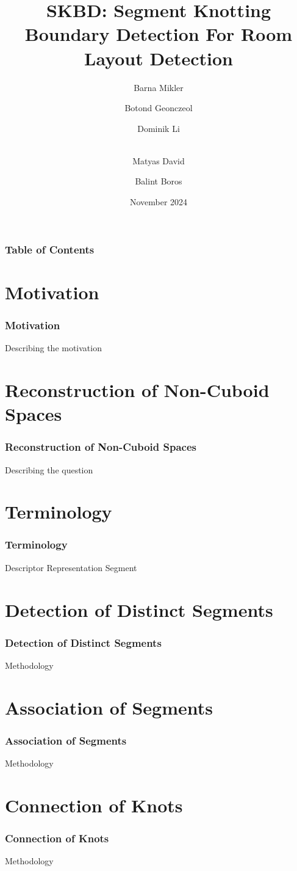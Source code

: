 \documentclass{beamer}
\title[SKBD] {SKBD: Segment Knotting Boundary Detection For Room Layout Detection}
\author[Pictures]
{Barna Mikler \and Botond Geonczeol \and Dominik Li \and \\ Matyas David \and Balint Boros}
\institute[ELTE]{Eötvös Loránd University \\ Faculty of Informatics}
\date[2024] {November 2024}
\begin{document}
\frame{\titlepage}

\begin{frame}
\frametitle{Table of Contents}
\tableofcontents
\end{frame}  

\section{Motivation}
\begin{frame}
\frametitle{Motivation}
Describing the motivation
\end{frame}

\section{Reconstruction of Non-Cuboid Spaces}
\begin{frame}
\frametitle{Reconstruction of Non-Cuboid Spaces}
Describing the question
\end{frame}

\section{Terminology}
\begin{frame}
\frametitle{Terminology}
Descriptor
Representation
Segment

\end{frame}

\section{Detection of Distinct Segments}
\begin{frame}
\frametitle{Detection of Distinct Segments}
Methodology
\end{frame}

\section{Association of Segments}
\begin{frame}
\frametitle{Association of Segments}
Methodology
\end{frame}

\section{Connection of Knots}
\begin{frame}
\frametitle{Connection of Knots}
Methodology
\end{frame}
\end{document}
